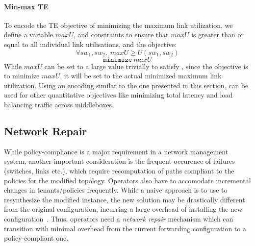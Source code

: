 \paragraph{Min-max TE}
To encode the TE objective of minimizing the maximum link utilization, we define
a variable $maxU$, and constraints to ensure that $maxU$ is greater than or equal to all 
individual link utilisations, and the objective: 
\begin{equation} \label{eq:maxu}
\forall sw_1, sw_2.\ \ maxU \geq U(sw_1, sw_2)
\end{equation} 
\begin{equation}
		\texttt{minimize}\ maxU
\end{equation}
While $maxU$ can be set to a large value trivially to satisfy , 
since the objective is to minimize $maxU$, it will be set to the actual
minimized maximum link utilization. Using an encoding similar to the one presented in this section, \name can be used for other
quantitative objectives like minimizing total latency and load balancing
traffic across middleboxes.

\subsection{Network Repair}
While policy-compliance is a major requirement in a network management system,
another important consideration is the frequent occurence of failures (switches, links etc.),
which require recomputation of paths compliant to the policies for the modified topology. Operators also have to accomodate incremental changes in tenants/policies frequently. 
While a naive approach is to use \name to resynthesize the modified instance,
the new solution may be drastically different from the original configuration, incurring a
large overhead of installing the new configuration~\cite{sdnlatency,updatescheduling}. Thus, operators
need a \emph{network repair} mechanism which can transition with minimal
overhead from the current
forwarding configuration to a policy-compliant one. 

